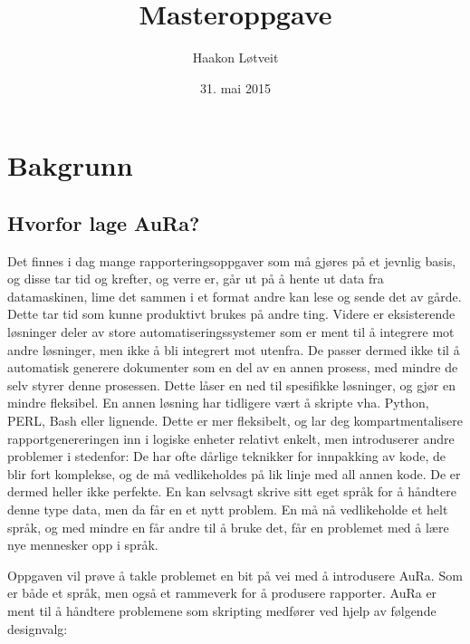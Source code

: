 \documentclass[norsk, 11pt, a4paper]{article}
\begin{document}

\title{Masteroppgave}
\author{Haakon Løtveit}
\date{31. mai 2015}
\maketitle
\newpage
\tableofcontents
\newpage 
\newpage \section{Bakgrunn}


\subsection{Hvorfor lage AuRa?}
Det finnes i dag mange rapporteringsoppgaver som må gjøres på et jevnlig basis, og disse tar tid og krefter, og verre er, går ut på å hente ut data fra datamaskinen, lime det sammen i et format andre kan lese og sende det av gårde.
Dette tar tid som kunne produktivt brukes på andre ting. Videre er eksisterende løsninger deler av store automatiseringssystemer som er ment til å integrere mot andre løsninger, men ikke å bli integrert mot utenfra. De passer dermed ikke til å automatisk generere dokumenter som en del av en annen prosess, med mindre de selv styrer denne prosessen. Dette låser en ned til spesifikke løsninger, og gjør en mindre fleksibel. En annen løsning har tidligere vært å skripte vha. Python, PERL, Bash eller lignende. Dette er mer fleksibelt, og lar deg kompartmentalisere rapportgenereringen inn i logiske enheter relativt enkelt, men introduserer andre problemer i stedenfor: De har ofte dårlige teknikker for innpakking av kode, de blir fort komplekse, og de må vedlikeholdes på lik linje med all annen kode. De er dermed heller ikke perfekte. En kan selvsagt skrive sitt eget språk for å håndtere denne type data, men da får en et nytt problem. En må nå vedlikeholde et helt språk, og med mindre en får andre til å bruke det, får en problemet med å lære nye mennesker opp i språk.



Oppgaven vil prøve å takle problemet en bit på vei med å introdusere AuRa. Som er både et språk, men også et rammeverk for å produsere rapporter. AuRa er ment til å håndtere problemene som skripting medfører ved hjelp av følgende designvalg:
\end{document}
